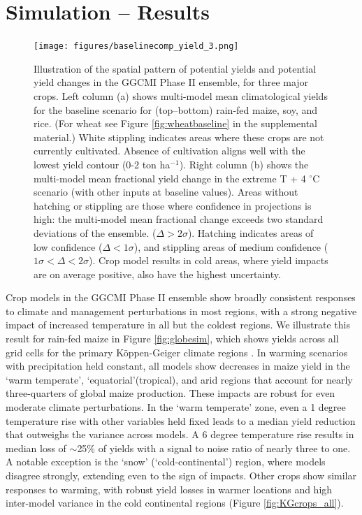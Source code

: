 \documentclass[preprint, 5p, times, twocolumn]{elsarticle}
\begin{document}
\section{Simulation -- Results}
\label{S:3}
\begin{figure}[!ht]
\centering
   \texttt{[image: figures/baselinecomp\_yield\_3.png]} 
   \caption{Illustration of the spatial pattern of potential yields and potential yield changes in the GGCMI Phase II ensemble, for three major crops. Left column (a) shows multi-model mean climatological yields for the baseline scenario for (top--bottom) rain-fed maize, soy, and rice. (For wheat see Figure \ref{fig:wheatbaseline} in the supplemental material.) White stippling indicates areas where these crops are not currently cultivated. Absence of cultivation aligns well with the lowest yield contour (0-2 ton ha$^{-1}$). Right column (b) shows the multi-model mean fractional yield change in the extreme T + 4 $^{\circ}$C scenario (with other inputs at baseline values). Areas without hatching or stippling are those where confidence in projections is high: the multi-model mean fractional change exceeds two standard deviations of the ensemble. ($\Delta > 2\sigma$). Hatching indicates areas of low confidence ($\Delta < 1 \sigma$), and stippling areas of medium confidence ($1 \sigma < \Delta < 2 \sigma$). Crop model results in cold areas, where yield impacts are on average positive, also have the highest uncertainty.}
   \label{fig:maizesoybaseline}
\end{figure}

Crop models in the GGCMI Phase II ensemble show broadly consistent responses to climate and management perturbations in most regions, with a strong negative impact of increased temperature in all but the coldest regions. We illustrate this result for rain-fed maize in Figure \ref{fig:globesim}, which shows yields across all grid cells for the primary K\"{o}ppen-Geiger climate regions \citep{rubel2010}. In warming scenarios with precipitation held constant, all models show decreases in maize yield in the `warm temperate', `equatorial'(tropical), and arid regions that account for nearly three-quarters of global maize production. These impacts are robust for even moderate climate perturbations. In the `warm temperate' zone, even a 1 degree temperature rise with other variables held fixed leads to a median yield reduction that outweighs the variance across models. A 6 degree temperature rise results in median loss of $\sim$25\% of yields with a signal to noise ratio of nearly three to one. A notable exception is the `snow' (`cold-continental') region, where models disagree strongly, extending even to the sign of impacts. Other crops show similar responses to warming, with robust yield losses in warmer locations and high inter-model variance in the cold continental regions (Figure \ref{fig:KGcrops_all}).
\end{document}

